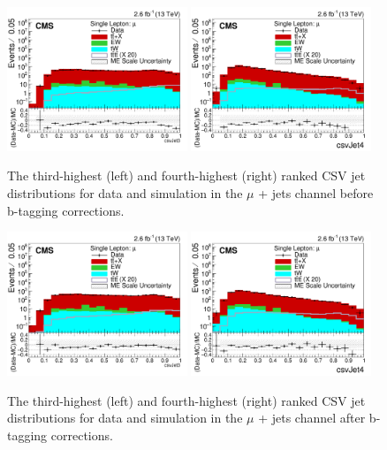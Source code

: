 \begin{figure}[ht!]
    \includegraphics[width=0.48\textwidth]{images/Run2/csvJet3_StackLogY_noSF.pdf}
    \includegraphics[width=0.48\textwidth]{images/Run2/csvJet4_StackLogY_noSF.pdf}
    \caption{ The third-highest (left) and fourth-highest (right) ranked CSV jet distributions for data and simulation in the $\mu$ + jets channel before b-tagging corrections.}
    \label{fig:csvJet3SF}
\end{figure}
\begin{figure}[ht!]
    \includegraphics[width=0.48\textwidth]{images/Run2/csvJet3_StackLogY.pdf}
    \includegraphics[width=0.48\textwidth]{images/Run2/csvJet4_StackLogY.pdf}
    \caption{The third-highest (left) and fourth-highest (right) ranked CSV jet distributions for data and simulation in the $\mu$ + jets channel after b-tagging corrections.}
    \label{fig:csvJet4SF}
\end{figure}
 

